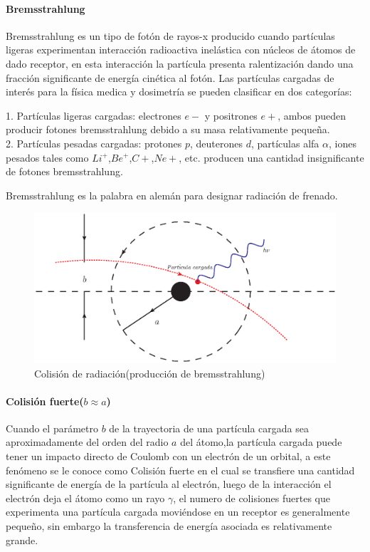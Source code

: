 \paragraph{Bremsstrahlung}
Bremsstrahlung es un tipo de fotón de rayos-x producido cuando partículas ligeras experimentan interacción radioactiva inelástica con núcleos de átomos de dado receptor, en esta interacción la partícula presenta ralentización
 dando una fracción significante de energía cinética al fotón\cite{Frank}. Las partículas cargadas de interés para la física medica y dosimetría se pueden clasificar en dos categorías:

1. Partículas ligeras cargadas: electrones $e-$ y positrones $e+$, ambos pueden producir fotones bremsstrahlung debido a su masa relativamente pequeña\cite{Podgorsak}.\\
2. Partículas pesadas cargadas: protones $p$, deuterones $d$, partículas alfa $\alpha$, iones pesados tales como $Li^+$,$Be^+$,$C+$,$Ne+$, etc. producen una cantidad insignificante de fotones bremsstrahlung\cite{Podgorsak}.

Bremsstrahlung es la palabra en alemán para designar radiación de frenado.

\begin{figure}[htbp]
   \centering
   \includegraphics[width=.65\linewidth]{./Figures/radiacol.eps}
   \caption[Colisión de radiación]{Colisión de radiación(producción de bremsstrahlung)}
   \label{fig:B}
\end{figure}


\paragraph{Colisión fuerte($b\approx a$)}
Cuando el parámetro $b$ de la trayectoria de una partícula cargada sea aproximadamente del orden del radio $a$ del átomo,la partícula cargada puede tener un impacto directo de Coulomb con un electrón de un orbital, a este fenómeno se le conoce como Colisión fuerte en el cual se transfiere una cantidad significante de energía de la partícula al electrón, luego de la interacción el electrón deja el átomo como un rayo $\gamma$, el numero de colisiones fuertes que  experimenta  una partícula cargada moviéndose en un receptor es generalmente pequeño, sin embargo la transferencia de energía asociada es relativamente grande\cite{Podgorsak}.


